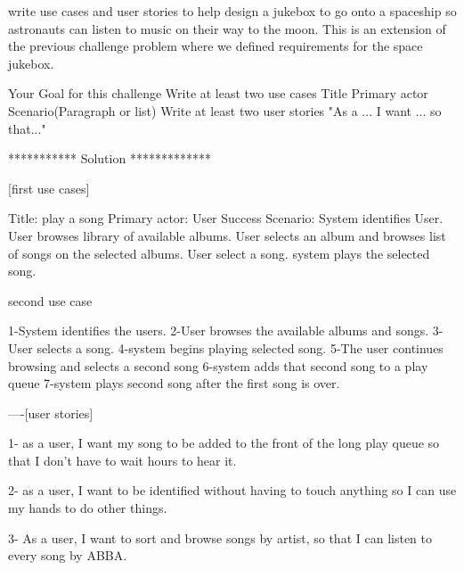 write use cases and user stories to help design a jukebox to go onto a spaceship so astronauts can listen to music on their way to the moon. 
This is an extension of the previous challenge problem where we defined requirements for the space jukebox.

Your Goal for this challenge
  Write at least two use cases 
    Title 
    Primary actor 
    Scenario(Paragraph or list)
  Write at least two user stories 
    "As a ... I want ... so that..."

*********** Solution *************



[first use cases] 

Title: play a song 
Primary actor: User 
Success Scenario: 
System identifies User. 
User browses library of available albums.
User selects an album and browses list of songs on the selected albums. 
User select a song. 
system plays the selected song.

second use case 

1-System identifies the users.
2-User browses the available albums and songs.
3-User selects a song.
4-system begins playing selected song.
5-The user continues browsing and selects a second song
6-system adds that second song to a play queue
7-system plays second song after the first song is over. 

----[user stories]

1- as a user, I want my song to be added to the front of the long play queue so that I don't have to wait hours to hear it. 

2- as a user, I want to be identified without having to touch anything so I can use my hands to do other things.

3- As a user, I want to sort and browse songs by artist, so that I can listen to every song by ABBA.